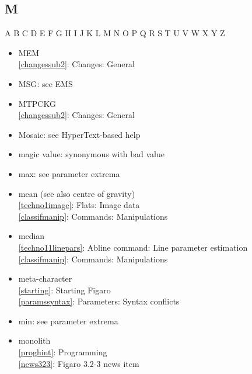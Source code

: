\documentclass[11pt,twoside]{article}
\newcommand{\htmlref}[2]{#1}
\newcommand{\idxint}[2]{\ref{#1}: \htmlref{#2}{#1}}
\newcommand{\idxint}[2]{\htmlref{#2}{#1}}
\begin{document}
\subsection*{\label{index_M}M}

\begin{htmlonly}
\htmlref{A}{index_A}
\htmlref{B}{index_B}
\htmlref{C}{index_C}
\htmlref{D}{index_D}
\htmlref{E}{index_E}
\htmlref{F}{index_F}
\htmlref{G}{index_G}
\htmlref{H}{index_H}
\htmlref{I}{index_I}
\htmlref{J}{index_J}
\htmlref{K}{index_K}
\htmlref{L}{index_L}
M
\htmlref{N}{index_N}
\htmlref{O}{index_O}
\htmlref{P}{index_P}
\htmlref{Q}{index_Q}
\htmlref{R}{index_R}
\htmlref{S}{index_S}
\htmlref{T}{index_T}
\htmlref{U}{index_U}
\htmlref{V}{index_V}
\htmlref{W}{index_W}
\htmlref{X}{index_X}
\htmlref{Y}{index_Y}
Z
\end{htmlonly}

\begin{itemize}
\item MEM\\
   \idxint{changessub2}{Changes: General}
\item MSG: see EMS
\item MTPCKG\\
   \idxint{changessub2}{Changes: General}
\item Mosaic: see HyperText-based help
\item magic value: synonymous with bad value
\item max: see parameter extrema
\item mean (see also centre of gravity)\\
   \idxint{techno1image}{Flats: Image data}\\
   \idxint{classifmanip}{Commands: Manipulations}
\item median\\
   \idxint{techno11linepars}{Abline command: Line parameter estimation}\\
   \idxint{classifmanip}{Commands: Manipulations}
\item meta-character\\
   \idxint{starting}{Starting Figaro}\\
   \idxint{paramssyntax}{Parameters: Syntax conflicts}
\item min: see parameter extrema
\item monolith\\
   \idxint{proghint}{Programming}\\
   \idxint{news323}{Figaro 3.2-3 news item}
\end{itemize}
\end{document}
